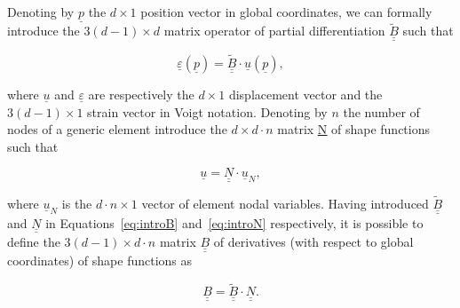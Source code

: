 \documentclass[review]{elsarticle}
\begin{document}

Denoting  by $\underline{p}$ the $d\times 1$ position vector in global coordinates, we can formally introduce the $3\left(d-1\right)\times d$ matrix operator of partial differentiation $\underline{\underline{\widetilde{B}}}$ such that

\begin{equation}\label{eq:introB}
\underline{\varepsilon}\left(\underline{p}\right)=\underline{\underline{\widetilde{B}}}\cdot\underline{u}\left(\underline{p}\right),
\end{equation}

where $\underline{u}$ and $\underline{\varepsilon}$ are respectively the $d\times 1$ displacement vector and the $3\left(d-1\right)\times 1$ strain vector in Voigt notation. Denoting by $n$ the number of nodes of a generic element  introduce the $d\times d\cdot n$ matrix \underline{\underline{N}} of shape functions such that

\begin{equation}\label{eq:introN}
\underline{u}=\underline{\underline{N}}\cdot\underline{u}_{N},
\end{equation}

where $\underline{u}_{N}$ is the $d\cdot n\times 1$ vector of element nodal variables. Having introduced $\underline{\underline{\widetilde{B}}}$ and $\underline{\underline{N}}$ in Equations~\ref{eq:introB} and~\ref{eq:introN} respectively, it is possible to define the $3\left(d-1\right)\times d\cdot n$ matrix $\underline{\underline{B}}$ of derivatives (with respect to global coordinates) of shape functions as

\begin{equation}
\underline{\underline{B}}=\underline{\underline{\widetilde{B}}}\cdot\underline{\underline{N}}.
\end{equation}
\end{document}

